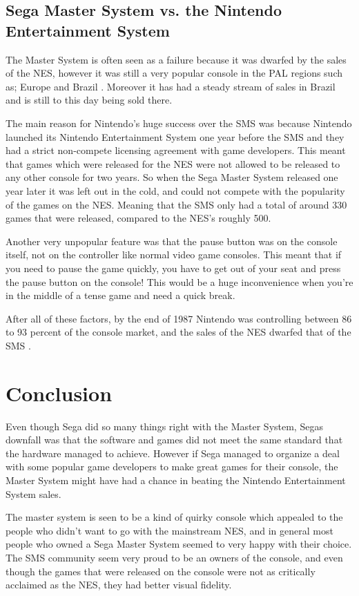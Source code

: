 \documentclass{scrartcl}
\begin{document}
\subsection{Sega Master System vs. the Nintendo Entertainment System} 

The Master System is often seen as a failure because it was dwarfed by the sales of the NES, however it was still a very popular console in the PAL regions such as; Europe and Brazil \cite{Weiss2009}. Moreover it has had a steady stream of sales in Brazil and is still to this day being sold there. \cite{Kent2001}

The main reason for Nintendo's huge success over the SMS was because Nintendo launched its Nintendo Entertainment System one year before the SMS and they had a strict non-compete licensing agreement with game developers. This meant that games which were released for the NES were not allowed to be released to any other console for two years.\cite{Weiss2009} So when the Sega Master System released one year later it was left out in the cold, and could not compete with the popularity of the games on the NES. Meaning that the SMS only had a total of around 330 games that were released, compared to the NES's roughly 500. \cite{russell}

Another very unpopular feature was that the pause button was on the console itself, not on the controller like normal video game consoles. This meant that if you need to pause the game quickly, you have to get out of your seat and press the pause button on the console! This would be a huge inconvenience when you're in the middle of a tense game and need a quick break.\cite{Weiss2009}

After all of these factors, by the end of 1987 Nintendo was controlling between 86 to 93 percent of the console market, and the sales of the NES dwarfed that of the SMS .\cite{Kent2001}


\section{Conclusion}


Even though Sega did so many things right with the Master System, Segas downfall was that the software and games did not meet the same standard that the hardware managed to achieve. However if Sega managed to organize a deal with some popular game developers to make great games for their console, the Master System might have had a chance in beating the Nintendo Entertainment System sales.

The master system is seen to be a kind of quirky console which appealed to the people who didn't want to go with the mainstream NES, and in general most people who owned a Sega Master System seemed to very happy with their choice. The SMS community seem very proud to be an owners of the console,  and even though the games that were released on the console were not as critically acclaimed as the NES, they had better visual fidelity.





\end{document}
